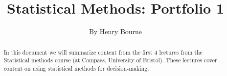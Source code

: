 \documentclass[a4paper]{article}
\title{Statistical Methods: Portfolio 1}
\author{By Henry Bourne}
\date{}
\begin{document}
\maketitle


\begin{abstract}
    In this document we will summarize content from the first 4 lectures from the Statistical methods course (at Compass, University of Bristol). These lectures cover content on using statistical methods for decision-making.
\end{abstract}







\small


\end{document}

